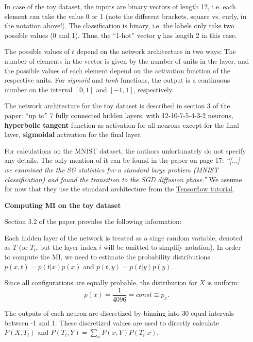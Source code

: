 \documentclass[12pt]{report}
\begin{document}
In case of the toy dataset, the inputs are binary vectors of length 12, i.e. each element can take the value 0 or 1 (note the different brackets, square vs. curly, in the notation above!). The classification is binary, i.e. the labels only take two possible values (0 and 1). Thus, the ``1-hot'' vector $y$ has length 2 in this case.
 
The possible values of $t$ depend on the network architecture in two ways: The number of elements in the vector is given by the number of units in the layer, and the possible values of each element depend on the activation function of the respective units. For {\it sigmoid} and {\it tanh} functions, the output is a continuous number on the interval $[0,1]$ and $[-1,1]$, respectively.

The network architecture for the toy dataset is described in section 3 of the paper: ``up to'' 7 fully connected hidden layers, with 12-10-7-5-4-3-2 neurons, {\bf hyperbolic tangent} function as activation for all neurons except for the final layer, {\bf sigmoidal} activation for the final layer.

For calculations on the MNIST dataset, the authors unfortunately do not specify any details. The only mention of it can be found in the paper on page 17: {\it ``[...] we examined the the SG statistics for a standard large problem (MNIST classification) and found the transition to the SGD diffusion phase.''} We assume for now that they use the standard architecture from the \href{https://www.tensorflow.org/get_started/mnist/beginners}{Tensorflow tutorial}.


\vspace{1cm}
{\bf Computing MI on the toy dataset}

Section 3.2 of the paper provides the following information:

Each hidden layer of the network is treated as a singe random variable, denoted as $T$ (or $T_i$, but the layer index $i$ will be omitted to simplify notation).
In order to compute the MI, we need to estimate the probability distributions $p(x,t)=p(t|x)p(x)$ and $p(t,y)=p(t|y)p(y)$.

Since all configurations are equally probable, the distribution for $X$ is uniform:
\begin{equation}
p(x) = \frac{1}{4096} = const \equiv p_x.
\end{equation}

The outputs of each neuron are discretized by binning into 30 equal intervals between -1 and 1. These discretized values are used to directly calculate $P(X, T_i)$ and $P(T_i, Y) = \sum_x P(x,Y)P(T_i | x)$.
\end{document}
